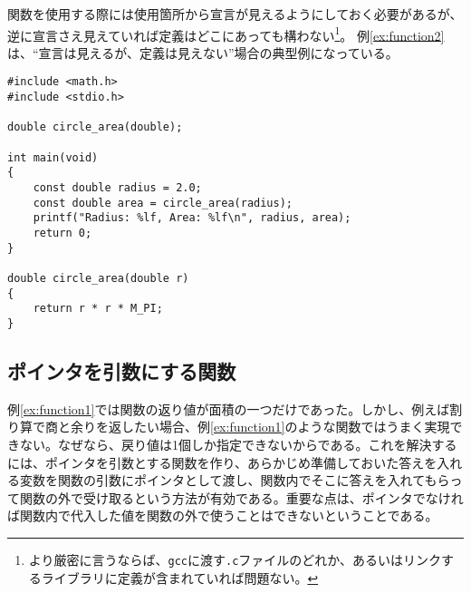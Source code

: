 関数を使用する際には使用箇所から宣言が見えるようにしておく必要があるが、逆に宣言さえ見えていれば定義はどこにあっても構わない\footnote{より厳密に言うならば、\texttt{gcc}に渡す\texttt{.c}ファイルのどれか、あるいはリンクするライブラリに定義が含まれていれば問題ない。}。
例\ref{ex:function2}は、``宣言は見えるが、定義は見えない''場合の典型例になっている。

\begin{reidai}\label{ex:function2}
    \begin{verbatim}
#include <math.h>
#include <stdio.h>

double circle_area(double);

int main(void)
{
    const double radius = 2.0;
    const double area = circle_area(radius);
    printf("Radius: %lf, Area: %lf\n", radius, area);
    return 0;
}

double circle_area(double r)
{
    return r * r * M_PI;
}
\end{verbatim}
\end{reidai}

\subsection{ポインタを引数にする関数}

例\ref{ex:function1}では関数の返り値が面積の一つだけであった。しかし、例えば割り算で商と余りを返したい場合、例\ref{ex:function1}のような関数ではうまく実現できない。なぜなら、戻り値は1個しか指定できないからである。これを解決するには、ポインタを引数とする関数を作り、あらかじめ準備しておいた答えを入れる変数を関数の引数にポインタとして渡し、関数内でそこに答えを入れてもらって関数の外で受け取るという方法が有効である。重要な点は、ポインタでなければ関数内で代入した値を関数の外で使うことはできないということである。

